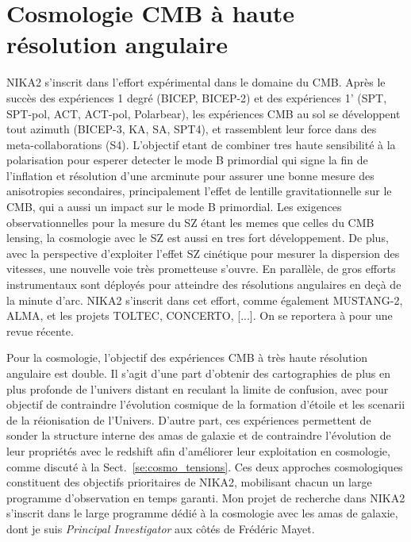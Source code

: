 %
%
%
%

%
%
%
%
%                 
%
%
%
\section{Cosmologie CMB à haute résolution angulaire}

NIKA2 s'inscrit dans l'effort expérimental dans le domaine du CMB. 
Après le succès des expériences 1 degré (BICEP, BICEP-2) et des
expériences 1' (SPT, SPT-pol, ACT, ACT-pol, Polarbear), les
expériences CMB au sol se développent tout azimuth (BICEP-3, KA, SA,
SPT4), et rassemblent leur force dans des meta-collaborations
(S4). L'objectif etant de combiner tres haute sensibilité à la
polarisation pour esperer detecter le mode B primordial qui signe la
fin de l'inflation et résolution d'une arcminute pour assurer une
bonne mesure des anisotropies secondaires, principalement l'effet de
lentille gravitationnelle sur le CMB, qui a aussi un impact sur le
mode B primordial. Les exigences observationnelles pour la mesure du
SZ étant les memes que celles du CMB lensing, la cosmologie avec le SZ
est aussi en tres fort développement. De plus, avec la perspective
d'exploiter l'effet SZ cinétique pour mesurer la dispersion des
vitesses, une nouvelle voie très prometteuse s'ouvre. En parallèle,
de gros efforts instrumentaux sont déployés pour atteindre des
résolutions angulaires en deçà de la minute d'arc. NIKA2 s'inscrit
dans cet effort, comme également MUSTANG-2, ALMA, et les projets
TOLTEC, CONCERTO, [...]. On se reportera à \citet{Tony2019} pour une
revue récente.

Pour la cosmologie, l'objectif des expériences CMB à très haute résolution
angulaire est double. Il s'agit d'une part d'obtenir des cartographies
de plus en plus profonde de l'univers distant en reculant la limite de
confusion, avec pour objectif de contraindre l'évolution cosmique de
la formation d'étoile et les scenarii de la réionisation de
l'Univers. D'autre part, ces expériences permettent de sonder la
structure interne des amas de galaxie et de contraindre l'évolution de
leur propriétés avec le redshift afin d'améliorer leur exploitation en
cosmologie, comme discuté à la Sect.~\ref{se:cosmo_tensions}. Ces deux
approches cosmologiques constituent des objectifs prioritaires de NIKA2,
mobilisant chacun un large programme d'observation en temps
garanti. Mon projet de recherche dans NIKA2 s'inscrit dans le large
programme dédié à la cosmologie avec les amas de galaxie, dont je suis
\emph{Principal Investigator} aux côtés de Frédéric Mayet. 




